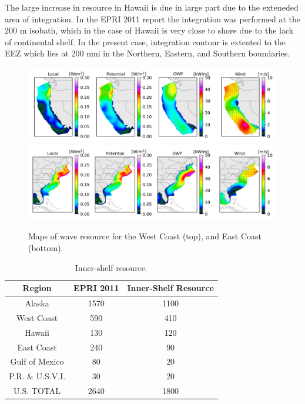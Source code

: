 The large increase in resource in Hawaii is due in large part due to the exteneded area of integration. In the EPRI 2011 report the integration was performed at the 200 m isobath, which in the case of Hawaii is very close to shore due to the lack of continental shelf. In the present case, integration contour is extented to the EEZ which lies at 200 nmi in the Northern, Eastern, and Southern boundaries.

\begin{figure}[ht]
  \centering
  \includegraphics[width=\textwidth]{../fig/WC-Map01-November.png}
  \includegraphics[width=\textwidth]{../fig/EC-Map01-November.png}
  \caption{Maps of wave resource for the West Coast (top), and East Coast (bottom). }
  \label{fig:maps}
\end{figure}


\begin{table}[ht]
  \centering
  \begin{tabular}{|c|c|c|}
    \hline
    Region & EPRI 2011 &Inner-Shelf Resource \\
    \hline
    Alaska & 1570 &1100 \\
    West Coast & 590 & 410 \\
    Hawaii & 130 & 120 \\
    East Coast & 240 & 90 \\
    Gulf of Mexico & 80 & 20 \\
    P.R. \& U.S.V.I. & 30 & 20 \\
    \hline \hline
    U.S. TOTAL & 2640 & 1800 \\
    \hline
  \end{tabular}
  \caption{Inner-shelf resource. }
  \label{tab:nearshore-total}
\end{table}

